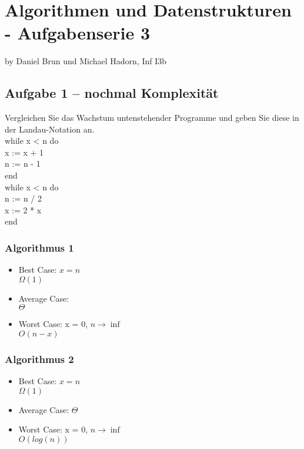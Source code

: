
\chapter*{Algorithmen und Datenstrukturen - Aufgabenserie 3}
\begin{flushright}
by Daniel Brun und Michael Hadorn, Inf I3b
\end{flushright}
\section*{Aufgabe 1 – nochmal Komplexität}

Vergleichen Sie das Wachstum untenstehender Programme und geben Sie diese in der Landau-Notation an.\\


while x < n do\\
	x := x + 1\\
	n := n - 1\\	
end\\


while x < n do\\
	n := n / 2\\
	x := 2 * x\\
end\\

\subsection*{Algorithmus 1}
\begin{itemize}
	\item Best Case:  $x = n$ \\
		  $\Omega(1)$
	\item Average Case: \\
		  $\Theta$
	\item Worst Case: x = 0, $n \rightarrow \inf$ \\
		  $O(n-x)$
\end{itemize}

\subsection*{Algorithmus 2}
\begin{itemize}
	\item Best Case:  $x = n$ \\
		  $\Omega(1)$
	\item Average Case:
		  $\Theta$
	\item Worst Case: x = 0, $n \rightarrow \inf$ \\
		  $O(log(n))$
\end{itemize}
\newpage

